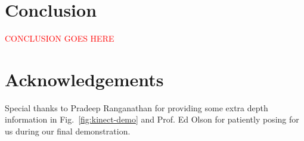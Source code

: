 \documentclass[letterpaper, 10pt, conference]{ieeeconf}
\newcommand{\xxx}[1]{\textcolor{red}{#1}}
\begin{document}
\section{Conclusion}
\xxx{CONCLUSION GOES HERE}

\section*{Acknowledgements}
Special thanks to Pradeep Ranganathan for providing some extra depth
information in Fig.~\ref{fig:kinect-demo} and Prof. Ed Olson for patiently
posing for us during our final demonstration.



\end{document}
